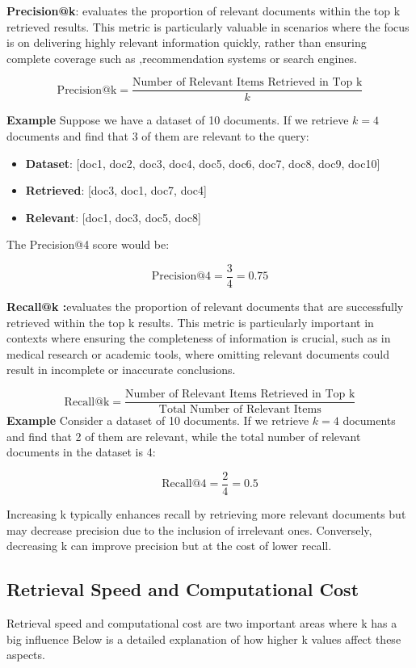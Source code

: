 \textbf{Precision@k}: evaluates the proportion of relevant documents within the top k retrieved results. This metric is particularly valuable in scenarios where the focus is on delivering highly relevant information quickly, rather than ensuring complete coverage such as ,recommendation systems or search engines\cite{deconvoluteai2024metrics}.


\[
\text{Precision@k} = \frac{\text{Number of Relevant Items Retrieved in Top k}}{k}
\]

\textbf{Example}
Suppose we have a dataset of 10 documents. If we retrieve \( k = 4 \) documents and find that 3 of them are relevant to the query:

\begin{itemize}
	\item \textbf{Dataset}: [doc1, doc2, doc3, doc4, doc5, doc6, doc7, doc8, doc9, doc10]
	\item \textbf{Retrieved}: [doc3, doc1, doc7, doc4]
	\item \textbf{Relevant}: [doc1, doc3, doc5, doc8]
\end{itemize}

The Precision@4 score would be:

\[
\text{Precision@4} = \frac{3}{4} = 0.75
\]


\textbf{Recall@k :}evaluates the proportion of relevant documents that are successfully retrieved within the top k results. This metric is particularly important in contexts where ensuring the completeness of information is crucial, such as in medical research or academic tools, where omitting relevant documents could result in incomplete or inaccurate conclusions\cite{deconvoluteai2024metrics}.

\[
\text{Recall@k} = \frac{\text{Number of Relevant Items Retrieved in Top k}}{\text{Total Number of Relevant Items}}
\]
\newline
\textbf{Example}
Consider a dataset of 10 documents. If we retrieve \( k = 4 \) documents and find that 2 of them are relevant, while the total number of relevant documents in the dataset is 4:

\[
\text{Recall@4} = \frac{2}{4} = 0.5
\]


Increasing k typically enhances recall by retrieving more relevant documents but may decrease precision due to the inclusion of irrelevant ones. Conversely, decreasing k can improve precision but at the cost of lower recall. 
\subsection{Retrieval Speed and Computational Cost}
Retrieval speed and computational cost are two important areas where k has a big influence Below is a detailed explanation of how higher k values affect these aspects.


